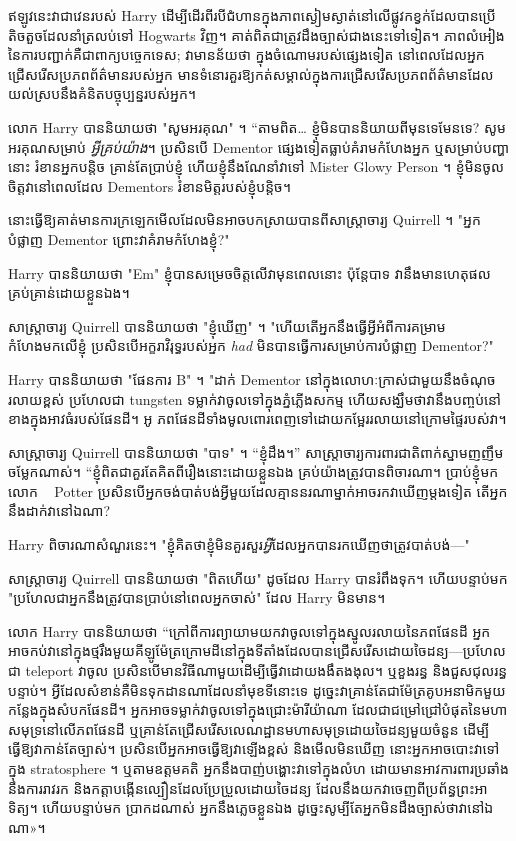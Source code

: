 {ឥឡូវនេះវាជាវេនរបស់ Harry ដើម្បីដើរពីរបីជំហានក្នុងភាពស្ងៀមស្ងាត់នៅលើផ្លូវកខ្វក់ដែលបានប្រើតិចតួចដែលនាំត្រលប់ទៅ Hogwarts វិញ។ គាត់​ពិត​ជា​ត្រូវ​ដឹង​ច្បាស់​ជាង​នេះ​ទៅ​ទៀត។ ភាពលំអៀងនៃការបញ្ជាក់គឺជាពាក្យបច្ចេកទេស; វាមានន័យថា ក្នុងចំណោមរបស់ផ្សេងទៀត នៅពេលដែលអ្នកជ្រើសរើសប្រភពព័ត៌មានរបស់អ្នក មានទំនោរគួរឱ្យកត់សម្គាល់ក្នុងការជ្រើសរើសប្រភពព័ត៌មានដែលយល់ស្របនឹងគំនិតបច្ចុប្បន្នរបស់អ្នក។

លោក Harry បាននិយាយថា "សូមអរគុណ" ។ “តាមពិត… ខ្ញុំមិនបាននិយាយពីមុនទេមែនទេ? សូមអរគុណសម្រាប់ \emph{អ្វីគ្រប់យ៉ាង}។ ប្រសិនបើ Dementor ផ្សេងទៀតធ្លាប់គំរាមកំហែងអ្នក ឬសម្រាប់បញ្ហានោះ រំខានអ្នកបន្តិច គ្រាន់តែប្រាប់ខ្ញុំ ហើយខ្ញុំនឹងណែនាំវាទៅ Mister Glowy Person ។ ខ្ញុំមិនចូលចិត្តវានៅពេលដែល Dementors រំខានមិត្តរបស់ខ្ញុំបន្តិច។

នោះធ្វើឱ្យគាត់មានការក្រឡេកមើលដែលមិនអាចបកស្រាយបានពីសាស្រ្តាចារ្យ Quirrell ។ "អ្នកបំផ្លាញ Dementor ព្រោះវាគំរាមកំហែងខ្ញុំ?"

Harry បាននិយាយថា "Em" ខ្ញុំបានសម្រេចចិត្តលើវាមុនពេលនោះ ប៉ុន្តែបាទ វានឹងមានហេតុផលគ្រប់គ្រាន់ដោយខ្លួនឯង។

សាស្រ្តាចារ្យ Quirrell បាននិយាយថា "ខ្ញុំឃើញ" ។ "ហើយតើអ្នកនឹងធ្វើអ្វីអំពីការគម្រាមកំហែងមកលើខ្ញុំ ប្រសិនបើអក្ខរាវិរុទ្ធរបស់អ្នក \emph{had} មិនបានធ្វើការសម្រាប់ការបំផ្លាញ Dementor?"

Harry បាននិយាយថា "ផែនការ B" ។ "ដាក់ Dementor នៅក្នុងលោហៈក្រាស់ជាមួយនឹងចំណុចរលាយខ្ពស់ ប្រហែលជា tungsten ទម្លាក់វាចូលទៅក្នុងភ្នំភ្លើងសកម្ម ហើយសង្ឃឹមថាវានឹងបញ្ចប់នៅខាងក្នុងអាវធំរបស់ផែនដី។ អូ ភពផែនដីទាំងមូលពោរពេញទៅដោយកម្អែររលាយនៅក្រោមផ្ទៃរបស់វា។

សាស្រ្តាចារ្យ Quirrell បាននិយាយថា "បាទ" ។ “ខ្ញុំដឹង។” សាស្ត្រាចារ្យ​ការពារ​ជាតិ​ពាក់​ស្នាម​ញញឹម​ចម្លែក​ណាស់។ “ខ្ញុំពិតជាគួរតែគិតពីរឿងនោះដោយខ្លួនឯង គ្រប់យ៉ាងត្រូវបានពិចារណា។ ប្រាប់ខ្ញុំមកលោក ~ Potter ប្រសិនបើអ្នកចង់បាត់បង់អ្វីមួយដែលគ្មាននរណាម្នាក់អាចរកវាឃើញម្តងទៀត តើអ្នកនឹងដាក់វានៅឯណា?

Harry ពិចារណាសំណួរនេះ។ "ខ្ញុំគិតថាខ្ញុំមិនគួរសួរ\emph{អ្វី}ដែលអ្នកបានរកឃើញថាត្រូវបាត់បង់—"

សាស្រ្តាចារ្យ Quirrell បាននិយាយថា "ពិតហើយ" ដូចដែល Harry បានរំពឹងទុក។ ហើយបន្ទាប់មក "ប្រហែលជាអ្នកនឹងត្រូវបានប្រាប់នៅពេលអ្នកចាស់" ដែល Harry មិនមាន។

លោក Harry បាននិយាយថា “ក្រៅពីការព្យាយាមយកវាចូលទៅក្នុងស្នូលរលាយនៃភពផែនដី អ្នកអាចកប់វានៅក្នុងថ្មរឹងមួយគីឡូម៉ែត្រក្រោមដីនៅក្នុងទីតាំងដែលបានជ្រើសរើសដោយចៃដន្យ—ប្រហែលជា teleport វាចូល ប្រសិនបើមានវិធីណាមួយដើម្បីធ្វើវាដោយងងឹតងងុល។ ឬខួងរន្ធ និងជួសជុលរន្ធបន្ទាប់។ អ្វី​ដែល​សំខាន់​គឺ​មិន​ទុក​ដាន​ណា​ដែល​នាំ​មុខ​ទី​នោះ​ទេ ដូច្នេះ​វា​គ្រាន់​តែ​ជា​ម៉ែត្រ​គូប​អនាមិក​មួយ​កន្លែង​ក្នុង​សំបក​ផែនដី។ អ្នកអាចទម្លាក់វាចូលទៅក្នុងជ្រោះម៉ារីយ៉ាណា ដែលជាជម្រៅជ្រៅបំផុតនៃមហាសមុទ្រនៅលើភពផែនដី ឬគ្រាន់តែជ្រើសរើសលេណដ្ឋានមហាសមុទ្រដោយចៃដន្យមួយចំនួន ដើម្បីធ្វើឱ្យវាកាន់តែច្បាស់។ ប្រសិនបើអ្នកអាចធ្វើឱ្យវាឡើងខ្ពស់ និងមើលមិនឃើញ នោះអ្នកអាចបោះវាទៅក្នុង stratosphere ។ ឬតាមឧត្ដមគតិ អ្នកនឹងបាញ់បង្ហោះវាទៅក្នុងលំហ ដោយមានអាវការពារប្រឆាំងនឹងការរាវរក និងកត្តាបង្កើនល្បឿនដែលប្រែប្រួលដោយចៃដន្យ ដែលនឹងយកវាចេញពីប្រព័ន្ធព្រះអាទិត្យ។ ហើយ​បន្ទាប់​មក ប្រាកដ​ណាស់ អ្នក​នឹង​ភ្លេច​ខ្លួន​ឯង ដូច្នេះ​សូម្បី​តែ​អ្នក​មិន​ដឹង​ច្បាស់​ថា​វា​នៅ​ឯ​ណា»។

}
